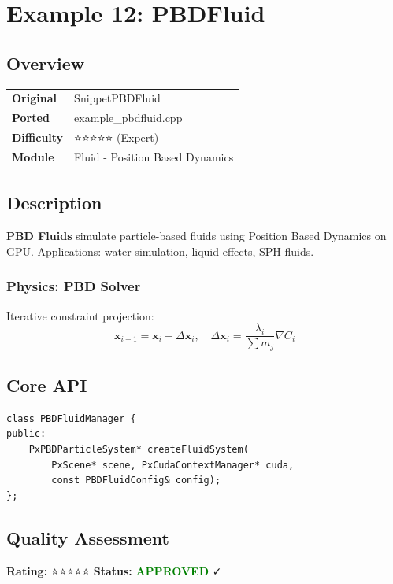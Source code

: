 \section{Example 12: PBDFluid}
\subsection{Overview}
\begin{table}[h]
\centering
\begin{tabular}{|l|l|}
\hline
\textbf{Original} & SnippetPBDFluid \\
\textbf{Ported} & example\_pbdfluid.cpp \\
\textbf{Difficulty} & ⭐⭐⭐⭐⭐ (Expert) \\
\textbf{Module} & Fluid - Position Based Dynamics \\
\hline
\end{tabular}
\end{table}

\subsection{Description}
\textbf{PBD Fluids} simulate particle-based fluids using Position Based Dynamics on GPU. Applications: water simulation, liquid effects, SPH fluids.

\subsubsection{Physics: PBD Solver}
Iterative constraint projection:
\begin{equation}
\mathbf{x}_{i+1} = \mathbf{x}_i + \Delta\mathbf{x}_i, \quad \Delta\mathbf{x}_i = \frac{\lambda_i}{\sum m_j} \nabla C_i
\end{equation}

\subsection{Core API}
\begin{lstlisting}
class PBDFluidManager {
public:
    PxPBDParticleSystem* createFluidSystem(
        PxScene* scene, PxCudaContextManager* cuda,
        const PBDFluidConfig& config);
};
\end{lstlisting}

\subsection{Quality Assessment}
\textbf{Rating:} ⭐⭐⭐⭐⭐ \quad \textbf{Status:} \textcolor{green}{\textbf{APPROVED}} ✓
